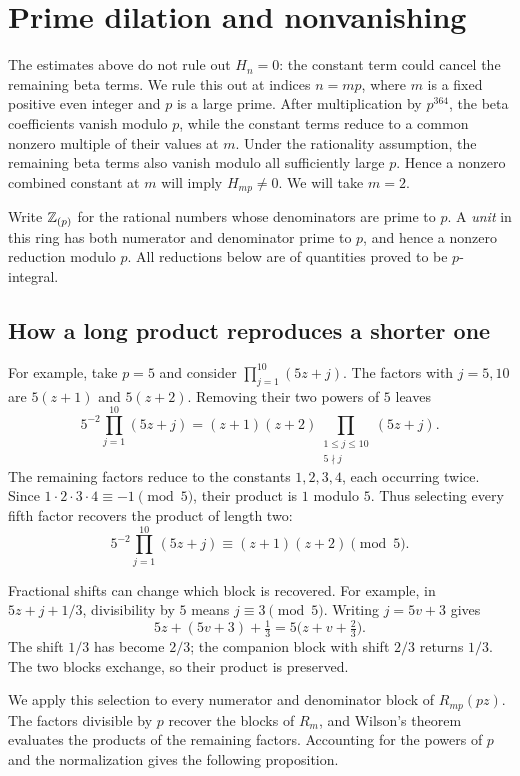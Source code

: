 \section{Prime dilation and nonvanishing}\label{sec:dilation}

The estimates above do not rule out $H_n=0$: the constant term could
cancel the remaining beta terms. We rule this out at indices $n=mp$,
where $m$ is a fixed positive even integer and $p$ is a large prime.
After multiplication by $p^{364}$, the beta coefficients vanish modulo
$p$, while the constant terms reduce to a common nonzero multiple of
their values at $m$. Under the rationality assumption, the remaining
beta terms also vanish modulo all sufficiently large $p$. Hence a
nonzero combined constant at $m$ will imply $H_{mp}\ne0$. We will take
$m=2$.

\begin{samepage}
Write $\mathbb Z_{(p)}$ for the rational numbers whose denominators are prime to $p$.
A \emph{unit} in this ring has both numerator and denominator prime to
$p$, and hence a nonzero reduction modulo $p$. All reductions below are
of quantities proved to be $p$-integral.

\subsection{How a long product reproduces a shorter one}

For example, take $p=5$ and consider $\prod_{j=1}^{10}(5z+j)$.
The factors with $j=5,10$ are
$5(z+1)$ and $5(z+2)$. Removing their two powers of $5$ leaves
\[
 5^{-2}\prod_{j=1}^{10}(5z+j)
 =(z+1)(z+2)\prod_{\substack{1\leq j\leq10\\5\nmid j}}(5z+j).
\]
The remaining factors reduce to the constants $1,2,3,4$, each occurring
twice. Since $1\cdot2\cdot3\cdot4\equiv-1\pmod5$, their product is $1$
modulo $5$. Thus selecting every fifth factor recovers the product of
length two:
\[
 5^{-2}\prod_{j=1}^{10}(5z+j)\equiv(z+1)(z+2)\pmod5.
\]
\end{samepage}
Fractional shifts can change which block is recovered. For example,
in $5z+j+1/3$, divisibility by $5$ means $j\equiv3\pmod5$. Writing
$j=5v+3$ gives
\[
 5z+(5v+3)+\tfrac13=5\bigl(z+v+\tfrac23\bigr).
\]
The shift $1/3$ has become $2/3$; the companion block with shift $2/3$
returns $1/3$. The two blocks exchange, so their product is preserved.

We apply this selection to every numerator and denominator block of
$R_{mp}(pz)$. The factors divisible by $p$ recover the blocks of $R_m$,
and Wilson's theorem evaluates the products of the remaining factors.
Accounting for the powers of $p$ and the normalization gives the
following proposition.

